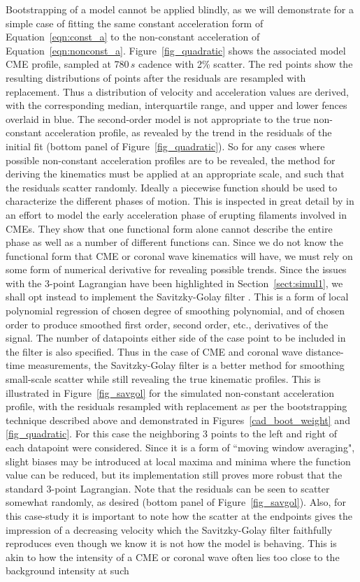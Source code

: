\documentclass[structabstract]{aa}
\begin{document}
Bootstrapping of a model cannot be applied blindly, as we will demonstrate for a simple case of fitting the same constant acceleration form of Equation~\ref{eqn:const_a} to the non-constant acceleration of Equation~\ref{eqn:nonconst_a}. Figure~\ref{fig_quadratic} shows the associated model CME profile, sampled at 780$\,s$ cadence with 2\% scatter. The red points show the resulting distributions of points after the residuals are resampled with replacement. Thus a distribution of velocity and acceleration values are derived, with the corresponding median, interquartile range, and upper and lower fences overlaid in blue. The second-order model is not appropriate to the true non-constant acceleration profile, as revealed by the trend in the residuals of the initial fit (bottom panel of Figure~\ref{fig_quadratic}). So for any cases where possible non-constant acceleration profiles are to be revealed, the method for deriving the kinematics must be applied at an appropriate scale, and such that the residuals scatter randomly. Ideally a piecewise function should be used to characterize the different phases of motion. This is inspected in great detail by \citet{2008ApJ...674..586S} in an effort to model the early acceleration phase of erupting filaments involved in CMEs. They show that one functional form alone cannot describe the entire phase as well as a number of different functions can. Since we do not know the functional form that CME or coronal wave kinematics will have, we must rely on some form of numerical derivative for revealing possible trends. Since the issues with the 3-point Lagrangian have been highlighted in Section~\ref{sect:simul1}, we shall opt instead to implement the Savitzky-Golay filter \citep{Savitzky-Golay1964}. This is a form of local polynomial regression of chosen degree of smoothing polynomial, and of chosen order to produce smoothed first order, second order, etc., derivatives of the signal. The number of datapoints either side of the case point to be included in the filter is also specified. Thus in the case of CME and coronal wave distance-time measurements, the Savitzky-Golay filter is a better method for smoothing small-scale scatter while still revealing the true kinematic profiles. This is illustrated in Figure~\ref{fig_savgol} for the simulated non-constant acceleration profile, with the residuals resampled with replacement as per the bootstrapping technique described above and demonstrated in Figures~\ref{cad_boot_weight} and \ref{fig_quadratic}. For this case the neighboring 3 points to the left and right of each datapoint were considered. Since it is a form of ``moving window averaging", slight biases may be introduced at local maxima and minima where the function value can be reduced, but its implementation still proves more robust that the standard 3-point Lagrangian. Note that the residuals can be seen to scatter somewhat randomly, as desired (bottom panel of Figure~\ref{fig_savgol}). Also, for this case-study it is important to note how the scatter at the endpoints gives the impression of a decreasing velocity which the Savitzky-Golay filter faithfully reproduces even though we know it is not how the model is behaving. This is akin to how the intensity of a CME or coronal wave often lies too close to the background intensity at such 
\end{document}

